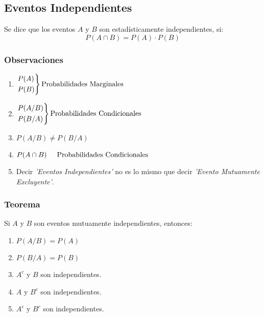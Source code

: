 \subsection{Eventos Independientes}
Se dice que los eventos $A$ y $B$ son estadísticamente independientes, si:
$$P(A\cap B)=P(A)\cdot P(B)$$
\subsubsection{Observaciones}
\begin{enumerate}
\item $\begin{rcases}
  P(A)\\
  P(B)
\end{rcases} \text{Probabilidades Marginales}$
\item $\begin{rcases}
  P(A/B)\\
  P(B/A)
\end{rcases} \text{Probabilidades Condicionales}$
\item $P(A/B)\neq P(B/A)$
\item $P(A \cap B) \hspace{0.5cm} \text{Probabilidades Condicionales}$
\item Decir \textit{'Eventos Independientes'} no es lo mismo que decir \textit{'Evento Mutuamente Excluyente'}.
\end{enumerate}
\subsubsection{Teorema}
Si $A$ y $B$ son eventos mutuamente independientes, entonces:
\begin{enumerate}
\item $P(A/B)=P(A)$
\item $P(B/A)=P(B)$
\item $A^c$ y $B$ son independientes.
\item $A$ y $B^c$ son independientes.
\item $A^c$ y $B^c$ son independientes.
\end{enumerate}
